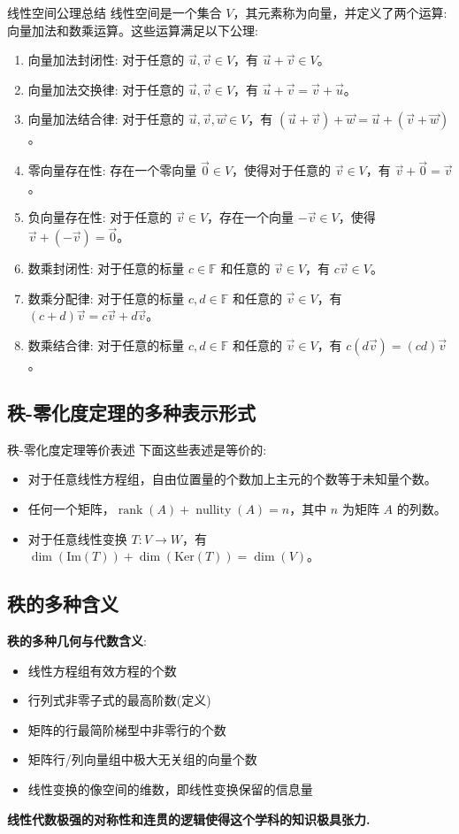 \documentclass[a4paper,12pt]{ctexart}
\begin{document}
\begin{myprop}{线性空间公理总结}{}
线性空间是一个集合 $V$，其元素称为向量，并定义了两个运算: 向量加法和数乘运算。这些运算满足以下公理:

\begin{enumerate}
    \item 向量加法封闭性: 对于任意的 $\vec{u}, \vec{v} \in V$，有 $\vec{u} + \vec{v} \in V$。
    \item 向量加法交换律: 对于任意的 $\vec{u}, \vec{v} \in V$，有 $\vec{u} + \vec{v} = \vec{v} + \vec{u}$。
    \item 向量加法结合律: 对于任意的 $\vec{u}, \vec{v}, \vec{w} \in V$，有 $(\vec{u} + \vec{v}) + \vec{w} = \vec{u} + (\vec{v} + \vec{w})$。
    \item 零向量存在性: 存在一个零向量 $\vec{0} \in V$，使得对于任意的 $\vec{v} \in V$，有 $\vec{v} + \vec{0} = \vec{v}$。
    \item 负向量存在性: 对于任意的 $\vec{v} \in V$，存在一个向量 $-\vec{v} \in V$，使得 $\vec{v} + (-\vec{v}) = \vec{0}$。
    \item 数乘封闭性: 对于任意的标量 $c \in \mathbb{F}$ 和任意的 $\vec{v} \in V$，有 $c \vec{v} \in V$。
    \item 数乘分配律: 对于任意的标量 $c, d \in \mathbb{F}$ 和任意的 $\vec{v} \in V$，有 $(c + d) \vec{v} = c \vec{v} + d \vec{v}$。
    \item 数乘结合律: 对于任意的标量 $c, d \in \mathbb{F}$ 和任意的 $\vec{v} \in V$，有 $c (d \vec{v}) = (cd) \vec{v}$。
\end{enumerate}
\end{myprop}

\newpage

\subsection{秩-零化度定理的多种表示形式}

\begin{mythm}{秩-零化度定理等价表述}{}
下面这些表述是等价的:
\begin{itemize}
    \item 对于任意线性方程组，自由位置量的个数加上主元的个数等于未知量个数。
    \item 任何一个矩阵，$\operatorname{rank}(A) + \operatorname{nullity}(A) = n$，其中 $n$ 为矩阵 $A$ 的列数。
    \item 对于任意线性变换 $T: V \to W$，有 $\dim(\text{Im}(T)) + \dim(\text{Ker}(T)) = \dim(V)$。
\end{itemize}
\end{mythm}

\subsection{秩的多种含义}
\begin{mynote}
\textbf{秩的多种几何与代数含义}:
\begin{itemize}
    \item 线性方程组有效方程的个数
    \item 行列式非零子式的最高阶数(定义)
    \item 矩阵的行最简阶梯型中非零行的个数
    \item 矩阵行/列向量组中极大无关组的向量个数
    \item 线性变换的像空间的维数，即线性变换保留的信息量
\end{itemize}
\end{mynote}

\textbf{线性代数极强的对称性和连贯的逻辑使得这个学科的知识极具张力.}
\end{document}
